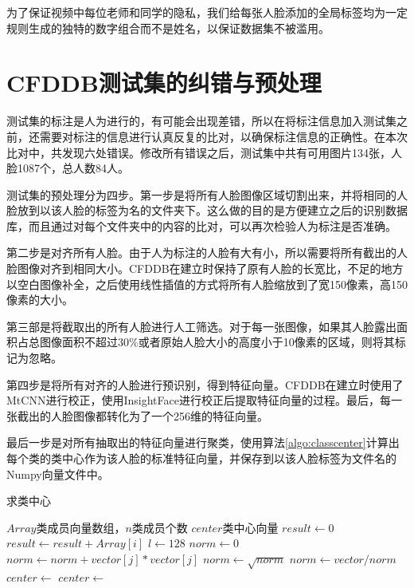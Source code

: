 为了保证视频中每位老师和同学的隐私，我们给每张人脸添加的全局标签均为一定规则生成的独特的数字组合而不是姓名，以保证数据集不被滥用。

\section{CFDDB测试集的纠错与预处理}

测试集的标注是人为进行的，有可能会出现差错，所以在将标注信息加入测试集之前，还需要对标注的信息进行认真反复的比对，以确保标注信息的正确性。在本次比对中，共发现六处错误。修改所有错误之后，测试集中共有可用图片134张，人脸1087个，总人数84人。

测试集的预处理分为四步。第一步是将所有人脸图像区域切割出来，并将相同的人脸放到以该人脸的标签为名的文件夹下。这么做的目的是方便建立之后的识别数据库，而且通过对每个文件夹中的内容的比对，可以再次检验人为标注是否准确。

第二步是对齐所有人脸。由于人为标注的人脸有大有小，所以需要将所有截出的人脸图像对齐到相同大小。CFDDB在建立时保持了原有人脸的长宽比，不足的地方以空白图像补全，之后使用线性插值的方式将所有人脸缩放到了宽150像素，高150像素的大小。

第三部是将截取出的所有人脸进行人工筛选。对于每一张图像，如果其人脸露出面积占总图像面积不超过$30\%$或者原始人脸大小的高度小于10像素的区域，则将其标记为忽略。

第四步是将所有对齐的人脸进行预识别，得到特征向量。CFDDB在建立时使用了MtCNN\cite{zhang2016joint}进行校正，使用InsightFace\cite{deng2018arcface}进行校正后提取特征向量的过程。最后，每一张截出的人脸图像都转化为了一个256维的特征向量。

最后一步是对所有抽取出的特征向量进行聚类，使用算法\ref{algo:classcenter}计算出每个类的类中心作为该人脸的标准特征向量，并保存到以该人脸标签为文件名的Numpy向量文件中。

\begin{algorithm}
	\caption{求类中心}
	\label{algo:classcenter}
	\begin{algorithmic}[1] %
		\Require $Array$类成员向量数组，$n$类成员个数 %
		\Ensure $center$类中心向量 %
		\State $result \gets 0$
		\State $result \gets result + Array[i]$
		\EndFor
		\State {}
		\EndFunction
		\State %
		\State $l\gets 128$
		\State $norm\gets 0$
		\State $norm\gets norm + vector[j] * vector[j]$
		\EndFor
		\State $norm\gets \sqrt{norm}$
		\State $norm\gets vector / norm$
		\State {}
		\EndFunction
		\State
		\State $center\gets $
		\State $center\gets $
		\State {}
		\EndFunction
	\end{algorithmic}
\end{algorithm}

